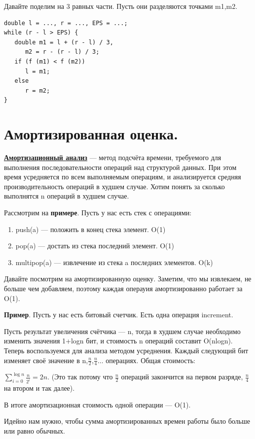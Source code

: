 \documentclass{article}
\newcommand{\deff}[1]{\underline{\textbf{#1}}}
\begin{document}
Давайте поделим на 3  равных части. Пусть они разделяются точками m1,m2.
\begin{lstlisting}[mathescape]
double l = ..., r = ..., EPS = ...; 
while (r - l > EPS) {
   double m1 = l + (r - l) / 3,
      m2 = r - (r - l) / 3;
   if (f (m1) < f (m2))
      l = m1;
   else
      r = m2;
}
\end{lstlisting}
\pagebreak
\section{Амортизированная оценка.}

\deff{Амортизационный анализ}  --- метод подсчёта времени, требуемого для выполнения последовательности операций над структурой данных. При этом время усредняется по всем выполняемым операциям, и анализируется средняя производительность операций в худшем случае. Хотим понять за сколько выполнятся n  операций в худшем случае.

Рассмотрим на \textbf{примере}. Пусть у нас есть стек с операциями: 

\begin{enumerate}
    \item push(a) ---  положить в конец стека элемент. O(1)
    \item pop(a) --- достать из стека последний элемент. O(1)
    \item multipop(a) --- извлечение из стека a последних элементов. O(k)
\end{enumerate}

Давайте посмотрим на амортизированную оценку.  Заметим, что мы извлекаем, не больше чем добавляем, поэтому каждая операуия амортизированно работает за O(1).

\textbf{Пример}. Пусть у нас есть битовый счетчик. Есть одна операция increment.

Пусть результат увеличения счётчика — n, тогда в худшем случае необходимо изменить значения 1+logn бит, и стоимость n  операций составит O(nlogn). Теперь воспользуемся для анализа методом усреднения. Каждый следующий бит изменяет своё значение в n,$\frac{n}{2}$,$\frac{n}{4} \ldots$ операциях. Общая стоимость:

$\sum\limits_{i=0}^{\log n} \frac{n}{2^i}=2n$. (Это так потому что $\frac{n}{2}$ операций закончится на первом разряде, $\frac{n}{4}$  на втором и так далее).

В итоге амортизационная стоимость одной операции — O(1).

Идейно нам нужно, чтобы сумма амортизированных времен работы было больше или равно  обычных.
\end{document}
